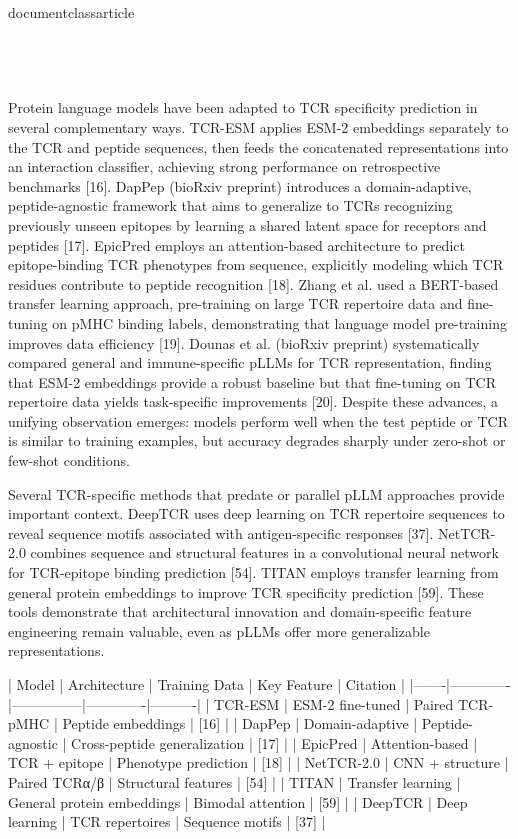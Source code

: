 \\documentclass{article}
\begin{document}
\subsection{}

Protein language models have been adapted to TCR specificity prediction in several complementary ways. TCR-ESM applies ESM-2 embeddings separately to the TCR and peptide sequences, then feeds the concatenated representations into an interaction classifier, achieving strong performance on retrospective benchmarks [16]. DapPep (bioRxiv preprint) introduces a domain-adaptive, peptide-agnostic framework that aims to generalize to TCRs recognizing previously unseen epitopes by learning a shared latent space for receptors and peptides [17]. EpicPred employs an attention-based architecture to predict epitope-binding TCR phenotypes from sequence, explicitly modeling which TCR residues contribute to peptide recognition [18]. Zhang et al. used a BERT-based transfer learning approach, pre-training on large TCR repertoire data and fine-tuning on pMHC binding labels, demonstrating that language model pre-training improves data efficiency [19]. Dounas et al. (bioRxiv preprint) systematically compared general and immune-specific pLLMs for TCR representation, finding that ESM-2 embeddings provide a robust baseline but that fine-tuning on TCR repertoire data yields task-specific improvements [20]. Despite these advances, a unifying observation emerges: models perform well when the test peptide or TCR is similar to training examples, but accuracy degrades sharply under zero-shot or few-shot conditions.

Several TCR-specific methods that predate or parallel pLLM approaches provide important context. DeepTCR uses deep learning on TCR repertoire sequences to reveal sequence motifs associated with antigen-specific responses [37]. NetTCR-2.0 combines sequence and structural features in a convolutional neural network for TCR-epitope binding prediction [54]. TITAN employs transfer learning from general protein embeddings to improve TCR specificity prediction [59]. These tools demonstrate that architectural innovation and domain-specific feature engineering remain valuable, even as pLLMs offer more generalizable representations.

| Model | Architecture | Training Data | Key Feature | Citation |
|-------|-------------|---------------|-------------|----------|
| TCR-ESM | ESM-2 fine-tuned | Paired TCR-pMHC | Peptide embeddings | [16] |
| DapPep | Domain-adaptive | Peptide-agnostic | Cross-peptide generalization | [17] |
| EpicPred | Attention-based | TCR + epitope | Phenotype prediction | [18] |
| NetTCR-2.0 | CNN + structure | Paired TCRα/β | Structural features | [54] |
| TITAN | Transfer learning | General protein embeddings | Bimodal attention | [59] |
| DeepTCR | Deep learning | TCR repertoires | Sequence motifs | [37] |
\end{document}
